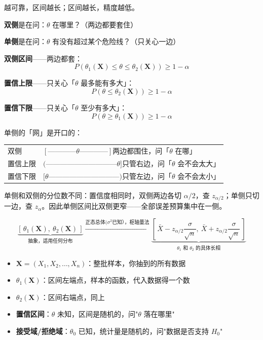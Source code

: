 \begin{dxtips}
越可靠，区间越长；区间越长，精度越低。
\end{dxtips}
\begin{note}[单侧与双侧置信区间]
\textbf{双侧}是在问：$\theta$ 在哪里？（两边都要套住）

\textbf{单侧}是在问：$\theta$ 有没有超过某个危险线？（只关心一边）

\textbf{双侧区间}——两边都套：
$$P(\theta_1(\boldsymbol{X}) \leq \theta \leq \theta_2(\boldsymbol{X})) \geq 1-\alpha$$

\textbf{置信上限}——只关心「$\theta$ 最多能有多大」：
$$P(\theta \leq \theta_2(\boldsymbol{X})) \geq 1-\alpha$$

\textbf{置信下限}——只关心「$\theta$ 至少有多大」：
$$P(\theta \geq \theta_1(\boldsymbol{X})) \geq 1-\alpha$$

单侧的「网」是开口的：
\begin{center}
\begin{tabular}{ll}
双侧 & $[\text{————}\theta\text{————}]$\quad 两边都围住，问「$\theta$ 在哪」\\[4pt]
置信上限 & $(\text{——————————}\theta]$\quad 只管右边，问「$\theta$ 会不会太大」\\[4pt]
置信下限 & $[\theta\text{——————————})$\quad 只管左边，问「$\theta$ 会不会太小」
\end{tabular}
\end{center}

单侧和双侧的分位数不同：置信度相同时，双侧两边各切 $\alpha/2$，查 $z_{\alpha/2}$；单侧只切一边，查 $z_\alpha$。因此单侧区间比双侧更窄——全部误差预算集中在一侧。
\end{note}

\begin{dxtips}
\[
\underbrace{[\,\theta_1(\boldsymbol{X}),\ \theta_2(\boldsymbol{X})\,]}_{\text{抽象，适用任何分布}}
\xrightarrow{\text{正态总体}(\sigma^2\text{已知），枢轴量法}}
\underbrace{\left[\,\bar{X} - z_{\alpha/2}\frac{\sigma}{\sqrt{n}},\ \bar{X} + z_{\alpha/2}\frac{\sigma}{\sqrt{n}}\,\right]}_{\theta_1 \text{ 和 } \theta_2 \text{ 的具体长相}}
\]
\end{dxtips}
\begin{itemize}
  \item $\boldsymbol{X} = (X_1, X_2, \ldots, X_n)$：整批样本，你抽到的所有数据
  \item $\theta_1(\boldsymbol{X})$：区间左端点，样本的函数，代入数据得一个数
  \item $\theta_2(\boldsymbol{X})$：区间右端点，同上
\end{itemize}
 \begin{itemize}
    \item \textbf{置信区间}：$\theta$ 未知，区间是随机的，问"$\theta$ 落在哪里"
    \item \textbf{接受域/拒绝域}：$\theta_0$ 已知，统计量是随机的，问"数据是否支持 $H_0$"
\end{itemize}
